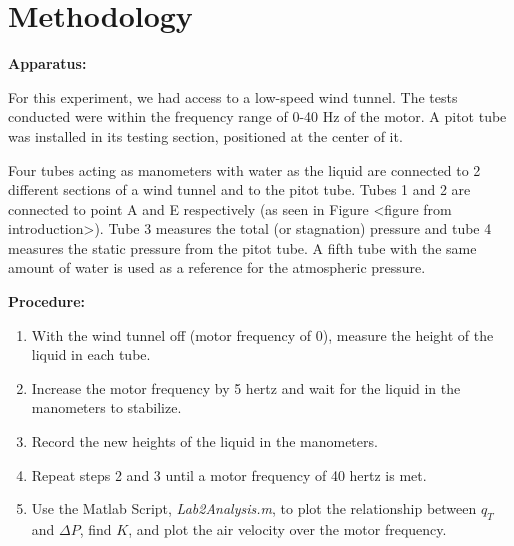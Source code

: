 \chapter{Methodology}
\label{cp:methodology}
\noindent\textbf{Apparatus:} \par
For this experiment, we had access to a low-speed wind tunnel. The tests conducted were within the frequency range of 0-40 Hz of the motor. A pitot tube was installed in its testing section, positioned at the center of it. \par
Four tubes acting as manometers with water as the liquid are connected to 2 different sections of a wind tunnel and to the pitot tube. Tubes 1 and 2 are connected to point A and E respectively (as seen in Figure <figure from introduction>). Tube 3 measures the total (or stagnation) pressure and tube 4 measures the static pressure from the pitot tube. A fifth tube with the same amount of water is used as a reference for the atmospheric pressure. \par
\noindent \textbf{Procedure:}  
\begin{enumerate}
    \item With the wind tunnel off (motor frequency of 0), measure the height of the liquid in each tube. 
    \item Increase the motor frequency by 5 hertz and wait for the liquid in the manometers to stabilize.   
    \item Record the new heights of the liquid in the manometers.  
    \item Repeat steps 2 and 3 until a motor frequency of 40 hertz is met.  
    \item Use the Matlab Script, {\it Lab2Analysis.m}, to plot the relationship between $q_T$ and $\Delta P$, find $K$, and plot the air velocity over the motor frequency. 
\end{enumerate}